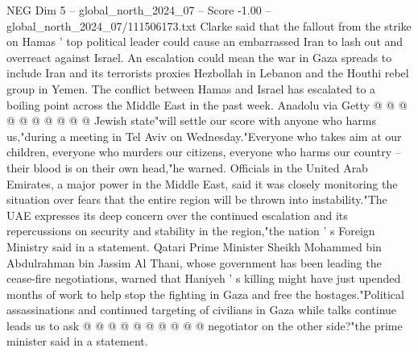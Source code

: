 \begin{textsample}{NEG Dim 5 – global\_north\_2024\_07 – Score -1.00 – global\_north\_2024\_07/111506173.txt}
Clarke said that the fallout from the strike on Hamas ' top political leader could cause an embarrassed Iran to lash out and overreact against Israel.
An escalation could mean the war in Gaza spreads to include Iran and its terrorists proxies Hezbollah in Lebanon and the Houthi rebel group in Yemen.
The conflict between Hamas and Israel has escalated to a boiling point across the Middle East in the past week.
Anadolu via Getty @ @ @ @ @ @ @ @ @ @ Jewish state"will settle our score with anyone who harms us,"during a meeting in Tel Aviv on Wednesday."Everyone who takes aim at our children, everyone who murders our citizens, everyone who harms our country -- their blood is on their own head,"he warned.
Officials in the United Arab Emirates, a major power in the Middle East, said it was closely monitoring the situation over fears that the entire region will be thrown into instability."The UAE expresses its deep concern over the continued escalation and its repercussions on security and stability in the region,"the nation ' s Foreign Ministry said in a statement.
Qatari Prime Minister Sheikh Mohammed bin Abdulrahman bin Jassim Al Thani, whose government has been leading the cease-fire negotiations, warned that Haniyeh ' s killing might have just upended months of work to help stop the fighting in Gaza and free the hostages."Political assassinations and continued targeting of civilians in Gaza while talks continue leads us to ask @ @ @ @ @ @ @ @ @ @ negotiator on the other side?"the prime minister said in a statement.

\end{textsample}
